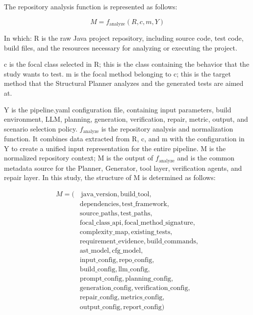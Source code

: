\documentclass[pdflatex,sn-basic,Numbered,iicol]{sn-jnl}
\begin{document}
The repository analysis function is represented as follows:

\begin{equation}
M = f_{\mathrm{analyze}}(R,c,m,Y)
\label{eq:repository-analysis}
\end{equation}

In which: R is the raw Java project repository, including source code, test code, build files, and the resources necessary for analyzing or executing the project.

c is the focal class selected in R; this is the class containing the behavior that the study wants to test. m is the focal method belonging to c; this is the target method that the Structural Planner analyzes and the generated tests are aimed at.

Y is the pipeline.yaml configuration file, containing input parameters, build environment, LLM, planning, generation, verification, repair, metric, output, and scenario selection policy. $f_{\mathrm{analyze}}$ is the repository analysis and normalization function. It combines data extracted from R, c, and m with the configuration in Y to create a unified input representation for the entire pipeline. M is the normalized repository context; M is the output of $f_{\mathrm{analyze}}$ and is the common metadata source for the Planner, Generator, tool layer, verification agents, and repair layer. In this study, the structure of M is determined as follows:

\begin{equation}
\begin{aligned}
M = (&\,\mathrm{java\_version},\mathrm{build\_tool},\\
&\mathrm{dependencies},\mathrm{test\_framework},\\
&\mathrm{source\_paths},\mathrm{test\_paths},\\
&\mathrm{focal\_class\_api},\mathrm{focal\_method\_signature},\\
&\mathrm{complexity\_map},\mathrm{existing\_tests},\\
&\mathrm{requirement\_evidence},\mathrm{build\_commands},\\
&\mathrm{ast\_model},\mathrm{cfg\_model},\\
&\mathrm{input\_config},\mathrm{repo\_config},\\
&\mathrm{build\_config},\mathrm{llm\_config},\\
&\mathrm{prompt\_config},\mathrm{planning\_config},\\
&\mathrm{generation\_config},\mathrm{verification\_config},\\
&\mathrm{repair\_config},\mathrm{metrics\_config},\\
&\mathrm{output\_config},\mathrm{report\_config})
\end{aligned}
\label{eq:repository-context}
\end{equation}
\end{document}
